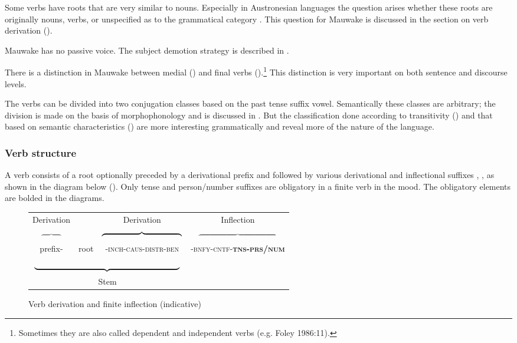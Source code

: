 Some verbs have roots that are very similar to nouns. Especially in Austronesian languages the question arises whether these roots are originally nouns, verbs, or unspecified as to the grammatical category \citep[162--165]{Bugenhagen1995}. This question for Mauwake is discussed in the section on verb derivation ().

Mauwake has no passive voice. The subject demotion strategy is described in . 

There is a distinction in Mauwake between medial () and final verbs ().\footnote{Sometimes they are also called dependent and independent verbs (e.g. {Foley 1986}:11).} This distinction is very important on both sentence and discourse levels. 

The verbs can be divided into two conjugation classes based on the past tense suffix vowel. Semantically these classes are arbitrary; the division is made on the basis of morphophonology and is discussed in . But the classification done according to transitivity () and that based on semantic characteristics () are more interesting grammatically and reveal more of the nature of the language. 

\subsubsection{Verb structure}\label{sec:3.8.1.3}
{}
A verb consists of a root optionally preceded by a derivational prefix  and followed by various derivational and inflectional suffixes , , as shown in the diagram below (). Only tense and person/number suffixes are obligatory in a finite verb in the  mood. The obligatory elements are bolded in the diagrams.

 
\begin{figure}
\setlength{\tabcolsep}{0pt}
\begin{tabular}{cccc}
 Derivation &  & Derivation & Inflection\\
$\overbrace{\hspace{1cm}}$ & & $\overbrace{\hspace{3.4cm}}$ &$\overbrace{\hspace{4cm}}$ \\
 prefix- & root &  -\textsc{inch-caus-distr-ben} & -\textsc{bnfy-cntf-\textbf{tns-prs/num}} \\
\multicolumn{3}{c}{$\underbrace{\hspace{6.2cm}}$}\\
\multicolumn{3}{c}{Stem}\\ 
\end{tabular}
 
\caption{Verb derivation and finite inflection (indicative)}
\label{fig:3:verbstructure}
\setlength{\tabcolsep}{6pt}
\end{figure}

